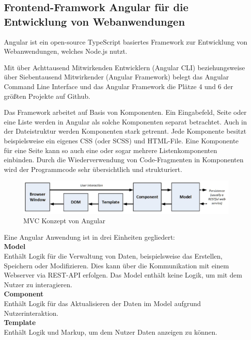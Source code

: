 \subsection{Frontend-Framwork Angular für die Entwicklung von Webanwendungen}

Angular ist ein open-source TypeScript basiertes Framework zur Entwicklung von Webanwendungen, welches Node.js nutzt.


Mit über Achttausend Mitwirkenden Entwicklern (Angular CLI) beziehungsweise über Siebentausend Mitwirkender (Angular Framework) belegt das Angular Command Line Interface und das Angular Framework die Plätze 4 und 6 der größten Projekte auf Github. 
\cite{OctoverseGitHubStatistics}

Das Framework arbeitet auf Basis von Komponenten. Ein Eingabefeld, Seite oder eine Liste werden in Angular als solche Komponenten separat betrachtet. Auch in der Dateistruktur werden Komponenten stark getrennt. Jede Komponente besitzt beispielsweise ein eigenes CSS (oder SCSS) und HTML-File. Eine Komponente für eine Seite kann so auch eine oder sogar mehrere Listenkomponenten einbinden. Durch die Wiederverwendung von Code-Fragmenten in Komponenten wird der Programmcode sehr übersichtlich und strukturiert.

\begin{figure}[h]
        \includegraphics[width=\linewidth]{img/Angular_MVC.JPG}
        \centering
        \caption{MVC Konzept von Angular \cite[S. 35, Abbildung 3-4]{ProAngular}}
        \label{fig:angularmvc}
\end{figure}

Eine Angular Anwendung ist in drei Einheiten gegliedert:\\

\textbf{Model}\\ 
Enthält Logik für die Verwaltung von Daten, beispielsweise das Erstellen, Speichern oder Modifizieren. Dies kann über die Kommunikation mit einem Webserver via REST-API erfolgen. Das Model enthält keine Logik, um mit dem Nutzer zu interagieren.\\

\textbf{Component}\\
Enthält Logik für das Aktualisieren der Daten im Model aufgrund Nutzerinteraktion. \\

\textbf{Template}\\ 
Enthält Logik und Markup, um dem Nutzer Daten anzeigen zu können.

\cite{ProAngular}